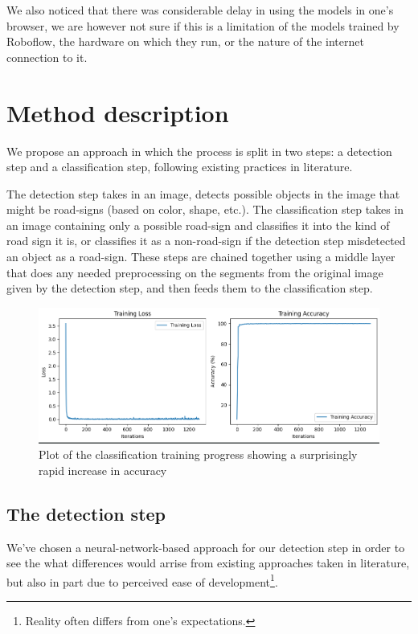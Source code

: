\documentclass[conference]{IEEEtran}
\begin{document}
We also noticed that there was considerable delay in using the models in one's browser, we are however
not sure if this is a limitation of the models trained by Roboflow, the hardware on which they run, or
the nature of the internet connection to it.

\section{Method description}

We propose an approach in which the process is split in two steps: a detection step and a
classification step, following existing practices in literature.

The detection step takes in an image, detects possible objects in the image that might be
road-signs (based on color, shape, etc.). The classification step takes in an image containing
only a possible road-sign and classifies it into the kind of road sign it is, or classifies it
as a non-road-sign if the detection step misdetected an object as a road-sign. These steps are
chained together using a middle layer that does any needed preprocessing on the segments from
the original image given by the detection step, and then feeds them to the classification step.

\begin{figure}
    \centerline{\includegraphics[width=\linewidth,]{overfit}}
    \caption{Plot of the classification training progress showing a surprisingly rapid increase in accuracy}
\end{figure}

\subsection{The detection step}

We've chosen a neural-network-based approach for our detection step in order to see the
what differences would arrise from existing approaches taken in literature, but also in
part due to perceived ease of development\footnote{Reality often differs from one's
expectations.}.
\end{document}
